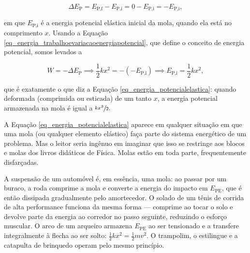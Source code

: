 $$\Delta E_\text{P} = E_\text{P,f} - E_\text{P,i} = 0 - E_\text{P,i} = - E_\text{P,i},$$

\noindent em que $E_\text{P,i}$ é a energia potencial elástica inicial da mola, quando ela está no comprimento $x.$ Usando a Equação \eqref{eq_energia_trabalhoevariacaoenergiapotencial}, que define o conceito de energia potencial, somos levados a

 $$ W = -\Delta E_\text{P} \implies \dfrac{1}{2}kx^2 = - (- E_\text{P,i}) \implies E_\text{P,i} = \dfrac{1}{2}kx^2, $$

\noindent que é exatamente o que diz a Equação \eqref{eq_energia_potencialelastica}: quando deformada (comprimida ou esticada) de um tanto $x$, a energia potencial armazenada na mola é igual a $\sfrac{kx^2}{2}.$





A Equação \eqref{eq_energia_potencialelastica} aparece em qualquer situação em que uma mola (ou qualquer elemento
elástico) faça parte do sistema energético de um problema. Mas o leitor seria ingênuo em imaginar que isso se
restringe aos blocos e molas dos livros didáticos de Física. Molas estão em toda parte, frequentemente
disfarçadas.

A suspensão de um automóvel é, em essência, uma mola: ao passar por um buraco, a roda
comprime a mola e converte a energia do impacto em $E_\text{PE}$, que é então dissipada
gradualmente pelo amortecedor. O solado de um tênis de corrida de alta performance funciona
da mesma forma --- comprime ao tocar o solo e devolve parte da energia ao corredor no
passo seguinte, reduzindo o esforço muscular. O arco de um arqueiro armazena $E_\text{PE}$ ao
ser tensionado e a transfere integralmente à flecha ao ser solto: $\frac{1}{2}kx^2 =
\frac{1}{2}mv^2$. O trampolim, o estilingue e a catapulta de brinquedo operam pelo mesmo
princípio.






